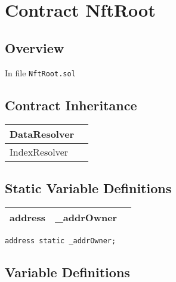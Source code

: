 
\chapter{Contract NftRoot}

\minitoc

\section{Overview}


In file {\tt NftRoot.sol}

\section{Contract Inheritance}


\noindent\begin{tabular}{|l|p{5cm}|}\hline
DataResolver & \\\hline
IndexResolver & \\\hline
\end{tabular}


\section{Static Variable Definitions}


\ifsoltables
\noindent\begin{tabular}{|l|l|p{5cm}|}\hline
address & \_{}addrOwner &  \\\hline
\end{tabular}
\fi


\begin{lstlisting}[firstnumber=32]
    address static _addrOwner;
\end{lstlisting}

\section{Variable Definitions}


